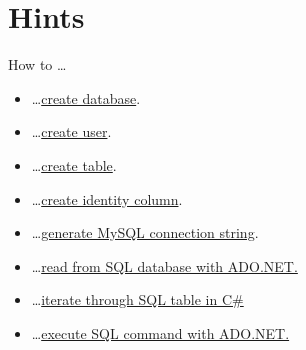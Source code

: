 \documentclass[12pt]{article}
\begin{document}
\clearpage

\section*{Hints}
How to \dots
\begin{itemize}
\item \dots \href{https://dev.mysql.com/doc/refman/5.7/en/creating-database.html}{create database}.
\item \dots \href{https://www.digitalocean.com/community/tutorials/mysql-ru}{create user}.
\item \dots \href{https://dev.mysql.com/doc/refman/5.5/en/creating-tables.html}{create table}.
\item \dots \href{https://dev.mysql.com/doc/refman/5.7/en/example-auto-increment.html}{create identity column}.
\item \dots \href{https://www.connectionstrings.com/mysql/}{generate MySQL connection string}.
\item \dots \href{https://stackoverflow.com/questions/6073382/read-sql-table-into-c-sharp-datatable}{read from SQL database with ADO.NET.}
\item \dots \href{https://stackoverflow.com/questions/1774498/how-to-iterate-through-a-datatable}{iterate through SQL table in C#}
\item \dots \href{https://docs.microsoft.com/en-us/dotnet/framework/data/adonet/executing-a-command}{execute SQL command with ADO.NET.}

\end{itemize}
\end{document}

